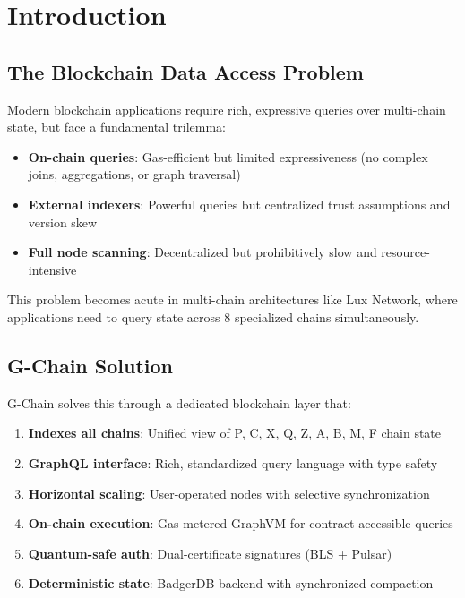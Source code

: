 \section{Introduction}


\subsection{The Blockchain Data Access Problem}

Modern blockchain applications require rich, expressive queries over multi-chain state, but face a fundamental trilemma:

\begin{itemize}
\item \textbf{On-chain queries}: Gas-efficient but limited expressiveness (no complex joins, aggregations, or graph traversal)
\item \textbf{External indexers}: Powerful queries but centralized trust assumptions and version skew
\item \textbf{Full node scanning}: Decentralized but prohibitively slow and resource-intensive
\end{itemize}

This problem becomes acute in multi-chain architectures like Lux Network, where applications need to query state across 8 specialized chains simultaneously.

\subsection{G-Chain Solution}

G-Chain solves this through a dedicated blockchain layer that:

\begin{enumerate}
\item \textbf{Indexes all chains}: Unified view of P, C, X, Q, Z, A, B, M, F chain state
\item \textbf{GraphQL interface}: Rich, standardized query language with type safety
\item \textbf{Horizontal scaling}: User-operated nodes with selective synchronization
\item \textbf{On-chain execution}: Gas-metered GraphVM for contract-accessible queries
\item \textbf{Quantum-safe auth}: Dual-certificate signatures (BLS + Pulsar)
\item \textbf{Deterministic state}: BadgerDB backend with synchronized compaction
\end{enumerate}

